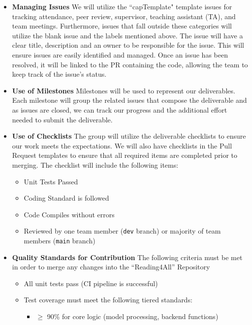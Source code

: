 \documentclass{article}
\begin{document}
\begin{itemize}
   \item \textbf{Managing Issues}\newline
  We will utilize the ``capTemplate" template issues for tracking attendance, peer review, supervisor, teaching assistant (TA), and team meetings. Furthermore, issues that fall outside these categories will utilize the blank issue and the labels mentioned above. \newline
  The issue will have a clear title, description and an owner to be responsible for the issue. This will ensure issues are easily identified and managed. Once an issue has been resolved, it will be linked to the PR containing the code, allowing the team to keep track of the issue's status.  
  \item \textbf{Use of Milestones}\newline
  Milestones will be used to represent our deliverables. Each milestone will group the related issues that compose the deliverable and as issues are closed, we can track our progress and the additional effort needed to submit the deliverable.
  \item \textbf{Use of Checklists} \newline
  The group will utilize the deliverable checklists to ensure our work meets the expectations. 
  We will also have checklists in the Pull Request templates to ensure that all required items are completed prior to merging. The checklist will include the following items: 
  \begin{itemize}
    \item Unit Tests Passed
    \item Coding Standard is followed 
    \item Code Compiles without errors
    \item Reviewed by one team member (\texttt{dev} branch) or majority of team members (\texttt{main} branch)
  \end{itemize}
  \item \textbf{Quality Standards for Contribution}\newline
  The following criteria must be met in order to merge any changes into the ``Reading4All'' Repository
  \begin{itemize}
    \item All unit tests pass (CI pipeline is successful)
    \item Test coverage must meet the following tiered standards:
    \begin{itemize}
        \item $\geq$ 90\% for core logic (model processing, backend functions)

\end{itemize}
\end{itemize}
\end{itemize}
\end{document}
